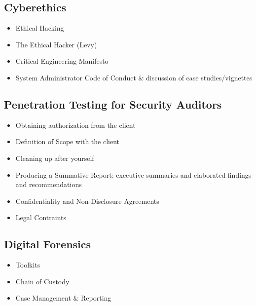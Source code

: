 \documentclass[letterpaper,10pt,english]{sphinxmanual}
\begin{document}
\subsection{Cyberethics}
\label{cybersecurity:cyberethics}\begin{itemize}
\item {} 
Ethical Hacking

\item {} 
The Ethical Hacker (Levy)

\item {} 
Critical Engineering Manifesto

\item {} 
System Administrator Code of Conduct \& discussion of case studies/vignettes

\end{itemize}


\subsection{Penetration Testing for Security Auditors}
\label{cybersecurity:penetration-testing-for-security-auditors}\begin{itemize}
\item {} 
Obtaining authorization from the client

\item {} 
Definition of Scope with the client

\item {} 
Cleaning up after yourself

\item {} 
Producing a Summative Report: executive summaries and elaborated findings and recommendations

\item {} 
Confidentiality and Non-Disclosure Agreements

\item {} 
Legal Contraints

\end{itemize}


\subsection{Digital Forensics}
\label{cybersecurity:digital-forensics}\begin{itemize}
\item {} 
Toolkits

\item {} 
Chain of Custody

\item {} 
Case Management \& Reporting

\end{itemize}
\end{document}
